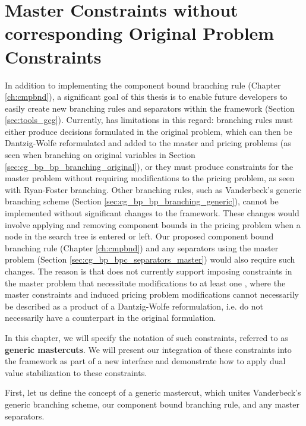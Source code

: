 \chapter{Master Constraints without corresponding Original Problem Constraints}\label{ch:gm}
In addition to implementing the component bound branching rule (Chapter \ref{ch:cmpbnd}), a significant goal of this thesis is to enable future \GCG{} developers to easily create new branching rules and separators within the framework (Section \ref{sec:tools_gcg}). Currently, \GCG{} has limitations in this regard: branching rules must either produce decisions formulated in the original problem, which can then be Dantzig-Wolfe reformulated and added to the master and pricing problems (as seen when branching on original variables in Section \ref{sec:cg_bp_bp_branching_original}), or they must produce constraints for the master problem without requiring modifications to the pricing problem, as seen with Ryan-Foster branching. Other branching rules, such as Vanderbeck's generic branching scheme (Section \ref{sec:cg_bp_bp_branching_generic}), cannot be implemented without significant changes to the \GCG{} framework. These changes would involve applying and removing component bounds in the pricing problem when a node in the search tree is entered or left. Our proposed component bound branching rule (Chapter \ref{ch:cmpbnd}) and any separators using the master problem (Section \ref{sec:cg_bp_bpc_separators_master}) would also require such changes. The reason is that \GCG{} does not currently support imposing constraints in the master problem that necessitate modifications to at least one \SP{}, where the master constraints and induced pricing problem modifications cannot necessarily be described as a product of a Dantzig-Wolfe reformulation, i.e. do not necessarily have a counterpart in the original formulation.

In this chapter, we will specify the notation of such constraints, referred to as \textbf{generic mastercuts}. We will present our integration of these constraints into the \GCG{} framework as part of a new interface and demonstrate how to apply dual value stabilization to these constraints.

First, let us define the concept of a generic mastercut, which unites Vanderbeck's generic branching scheme, our component bound branching rule, and any master separators.

